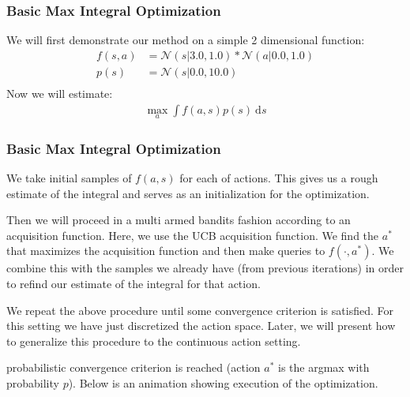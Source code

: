 \documentclass[9pt]{beamer}
\begin{document}
\begin{frame}
\frametitle{Basic Max Integral Optimization}
We will first demonstrate our method on a simple 2 dimensional function:
\begin{equation*}
\begin{split}
   f(s,a) &= \mathcal{N}(s | 3.0, 1.0) * \mathcal{N}(a | 0.0, 1.0) \\
   p(s) &= \mathcal{N}(s | 0.0, 10.0) \\
\end{split}
\end{equation*}
Now we will estimate:
\begin{equation*}
\begin{split}
   \max_{a} \int f(a,s) p(s) \ \text{d}s
\end{split}
\end{equation*}
\end{frame}

\begin{frame}
\frametitle{Basic Max Integral Optimization}
We take initial samples of $f(a,s)$ for each of actions. This gives us a rough estimate of the integral and serves as an initialization for the optimization.\newline \newline

Then we will proceed in a multi armed bandits fashion according to an acquisition function. Here, we use the UCB acquisition function. We find the $a^*$ that maximizes the acquisition function and then make queries to $f(\cdot , a^*)$. We combine this with the samples we already have (from previous iterations) in order to refind our estimate of the integral for that action.\newline \newline

We repeat the above procedure until some convergence criterion is satisfied. For this setting we have just discretized the action space. Later, we will present how to generalize this procedure to the continuous action setting.\newline \newline

probabilistic convergence criterion is reached (action $a^*$ is the argmax with probability $p$). Below is an animation showing execution of the optimization.
\end{frame}
\end{document}
